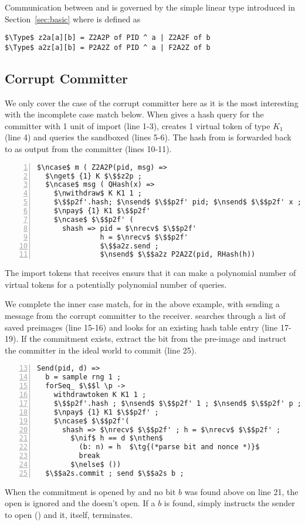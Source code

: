 Communication between \Z and \A is governed by the simple linear type \inline{comm[K][Z2A[2p][2f]} introduced in Section~\ref{sec:basic} where  is defined as 
\begin{lstlisting}[basicstyle=\footnotesize\BeraMonottFamily, mathescape]
$\Type$ z2a[a][b] = Z2A2P of PID ^ a | Z2A2F of b 
$\Type$ a2z[a][b] = P2A2Z of PID ^ a | F2A2Z of b
\end{lstlisting}

\subsection{Corrupt Committer}
We only cover the case of the corrupt committer here as it is the most interesting with the incomplete case match below.
When \Z gives \simcom a hash query for the committer with 1 unit of import (line 1-3), \simcom creates 1 virtual token of type $K_1$ (line 4) and queries the sandboxed \Fro (lines 5-6).  
The hash from \Fro is forwarded back to \Z as output  from the committer (lines 10-11).
\begin{lstlisting}[basicstyle=\footnotesize\BeraMonottFamily, mathescape, frame=single, numbers=left, xleftmargin=2em, xrightmargin=2em]
$\ncase$ m ( Z2A2P(pid, msg) =>
  $\nget$ {1} K $\$$z2p ;
  $\ncase$ msg ( QHash(x) =>
    $\nwithdraw$ K K1 1 ;
    $\$$p2f'.hash; $\nsend$ $\$$p2f' pid; $\nsend$ $\$$p2f' x ;
    $\npay$ {1} K1 $\$$p2f'
    $\ncase$ $\$$p2f' (
      shash => pid = $\nrecv$ $\$$p2f' 
               h = $\nrecv$ $\$$p2f'
               $\$$a2z.send ;
               $\nsend$ $\$$a2z P2A2Z(pid, RHash(h))
\end{lstlisting}
The import tokens that \simcom receives ensurs that it can make a polynomial number of virtual tokens for a potentially polynomial number of queries. 

We complete the inner case match, for  in the above example, with \Z sending a message from the corrupt committer to the receiver.
\simcom searches through a list of saved preimages  (line 15-16) and looks for an existing hash table entry (line 17-19). 
If the commitment exists, extract the bit from the pre-image and instruct the committer in the ideal world to commit (line 25).
\begin{lstlisting}[basicstyle=\footnotesize\BeraMonottFamily, mathescape, frame=single, numbers=left, xleftmargin=2em, xrightmargin=2em, firstnumber=13]
Send(pid, d) =>
  b = sample rng 1 ;
  forSeq_ $\$$l \p ->
    withdrawtoken K K1 1 ;
    $\$$p2f'.hash ; $\nsend$ $\$$p2f' 1 ; $\nsend$ $\$$p2f' p ;
    $\npay$ {1} K1 $\$$p2f' ;
    $\ncase$ $\$$p2f'( 
      shash => $\nrecv$ $\$$p2f' ; h = $\nrecv$ $\$$p2f' ;
        $\nif$ h == d $\nthen$
          (b: n) = h  $\tg{(*parse bit and nonce *)}$
          break
        $\nelse$ ())
  $\$$a2s.commit ; send $\$$a2s b ;
\end{lstlisting}
When the commitment is opened by \Z and no bit $b$ was found above on line 21, the open is ignored and the \Fcom doesn't open.
If a $b$ is found, \simcom simply instructs the sender to open () and it, itself, terminates.  

